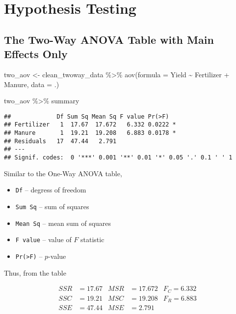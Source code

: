 \documentclass[
]{book}
\newenvironment{Shaded}{\begin{snugshade}}{\end{snugshade}}
\newcommand{\AttributeTok}[1]{\textcolor[rgb]{0.77,0.63,0.00}{#1}}
\newcommand{\FunctionTok}[1]{\textcolor[rgb]{0.00,0.00,0.00}{#1}}
\newcommand{\NormalTok}[1]{#1}
\newcommand{\OtherTok}[1]{\textcolor[rgb]{0.56,0.35,0.01}{#1}}
\newcommand{\SpecialCharTok}[1]{\textcolor[rgb]{0.00,0.00,0.00}{#1}}
\providecommand{\tightlist}{%
  \setlength{\itemsep}{0pt}\setlength{\parskip}{0pt}}
\begin{document}
\hypertarget{hypothesis-testing-1}{%
\chapter{Hypothesis Testing}\label{hypothesis-testing-1}}

\hypertarget{the-two-way-anova-table-with-main-effects-only}{%
\section{The Two-Way ANOVA Table with Main Effects Only}\label{the-two-way-anova-table-with-main-effects-only}}

\begin{Shaded}
\begin{Highlighting}[]
\NormalTok{two\_aov }\OtherTok{\textless{}{-}}\NormalTok{ clean\_twoway\_data }\SpecialCharTok{\%\textgreater{}\%} 
  \FunctionTok{aov}\NormalTok{(}\AttributeTok{formula =}\NormalTok{ Yield }\SpecialCharTok{\textasciitilde{}}\NormalTok{ Fertilizer }\SpecialCharTok{+}\NormalTok{ Manure, }\AttributeTok{data =}\NormalTok{ .)}
  
\NormalTok{two\_aov }\SpecialCharTok{\%\textgreater{}\%} 
\NormalTok{  summary}
\end{Highlighting}
\end{Shaded}

\begin{verbatim}
##             Df Sum Sq Mean Sq F value Pr(>F)  
## Fertilizer   1  17.67  17.672   6.332 0.0222 *
## Manure       1  19.21  19.208   6.883 0.0178 *
## Residuals   17  47.44   2.791                 
## ---
## Signif. codes:  0 '***' 0.001 '**' 0.01 '*' 0.05 '.' 0.1 ' ' 1
\end{verbatim}

Similar to the One-Way ANOVA table,

\begin{itemize}
\tightlist
\item
  \texttt{Df} -- degress of freedom
\item
  \texttt{Sum\ Sq} -- sum of squares
\item
  \texttt{Mean\ Sq} -- mean sum of squares
\item
  \texttt{F\ value} -- value of \(F\) statistic
\item
  \texttt{Pr(\textgreater{}F)} -- \(p\)-value
\end{itemize}

Thus, from the table

\begin{align}
    SSR &= 17.67 & MSR &= 17.672 & F_C = 6.332\\
    SSC &= 19.21 & MSC &= 19.208 & F_R = 6.883\\
    SSE &= 47.44 & MSE &= 2.791  & \\
  \end{align}
\end{document}
